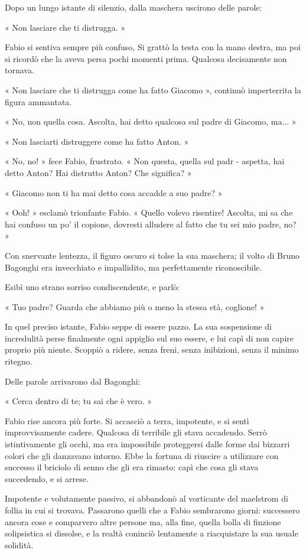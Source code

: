 Dopo un lungo istante di silenzio, dalla maschera uscirono delle parole:

« Non lasciare che ti distrugga. »

Fabio si sentiva sempre più confuso, Si grattò la testa con la mano destra, ma poi si ricordò che la aveva persa pochi momenti prima. Qualcosa decisamente non tornava.

« Non lasciare che ti distrugga come ha fatto Giacomo », continuò imperterrita la figura ammantata.

« No, non quella cosa. Ascolta, hai detto qualcosa sul padre di Giacomo, ma... »

« Non lasciarti distruggere come ha fatto Anton. »

« No, no! » fece Fabio, frustrato. « Non questa, quella sul padr - aspetta, hai detto Anton? Hai distrutto Anton? Che significa? »

« Giacomo non ti ha mai detto cosa accadde a suo padre? »

« Ooh! » esclamò trionfante Fabio. « Quello volevo risentire! Ascolta, mi sa che hai confuso un po' il copione, dovresti alludere al fatto che tu sei mio padre, no? »

Con snervante lentezza, il figuro oscuro si tolse la sua maschera; il volto di Bruno Bagonghi era invecchiato e impallidito, ma perfettamente riconoscibile.

Esibì uno strano sorriso condiscendente, e parlò:

« Tuo padre? Guarda che abbiamo più o meno la stessa età, coglione! »

In quel preciso istante, Fabio seppe di essere pazzo. La sua sospensione di incredulità perse finalmente ogni appiglio sul suo essere, e lui capì di non capire proprio più niente. Scoppiò a ridere, senza freni, senza inibizioni, senza il minimo ritegno.

Delle parole arrivarono dal Bagonghi:

« Cerca dentro di te; tu sai che è vero. »

Fabio rise ancora più forte. Si accasciò a terra, impotente, e si sentì improvvisamente cadere. Qualcosa di terribile gli stava accadendo. Serrò istintivamente gli occhi, ma era impossibile proteggersi dalle forme dai bizzarri colori che gli danzavano intorno. Ebbe la fortuna di riuscire a utilizzare con successo il briciolo di senno che gli era rimasto: capì che cosa gli stava succedendo, e si arrese.

Impotente e volutamente passivo, si abbandonò al vorticante del maelstrom di follia in cui si trovava. Passarono quelli che a Fabio sembrarono giorni: successero ancora cose e comparvero altre persone ma, alla fine, quella bolla di finzione solipsistica si dissolse, e la realtà coninciò lentamente a riacquistare la sua usuale solidità.